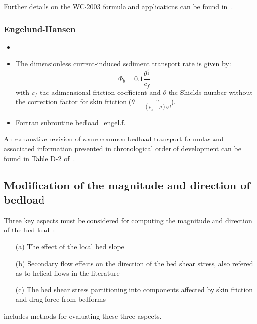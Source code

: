 Further details on the WC-2003 formula and applications can be found in~\cite{Cordieretal_2019,CORDIER2020103580}.

\noindent

\subsubsection{Engelund-Hansen}
\begin{itemize}
 \item {}
 \item The dimensionless current-induced sediment transport rate is given by:
  \begin{equation*}
  \Phi_b=0.1 \frac{\theta^{\frac{5}{2}}}{c_f}
  \end{equation*}
 with $c_f$ the adimensional friction coefficient and $\theta$ the Shields number without the correction factor for skin friction ($\theta=\frac{\tau_b}{(\rho_s-\rho)gd}$).
 \item Fortran subroutine {\ttfamily bedload\_engel.f}.
\end{itemize}
An exhaustive revision of some common bedload transport formulas and associated information presented in chronological order of development can be found in Table D-2 of~\cite{GarciaBook2006}.
\subsection{Modification of the magnitude and direction of bedload}\label{sec:corrections}
Three key aspects must be considered for computing the magnitude and direction of the bed load~\cite{Abad08}:
\begin{itemize}
\item[(a)] The effect of the local bed slope
\item[(b)] Secondary flow effects on the direction of the bed shear stress, also refered as to helical flows in the literature
\item[(c)] The bed shear stress partitioning into components affected by skin friction and drag force from bedforms
\end{itemize}
\noindent
\gaia{} includes methods for evaluating these three aspects.

